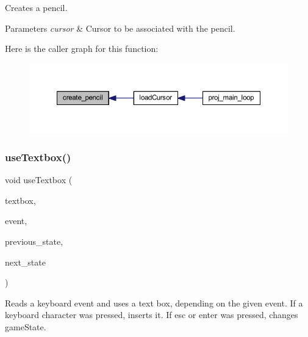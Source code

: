 Creates a pencil. 


\begin{DoxyParams}{Parameters}
{\em cursor} & Cursor to be associated with the pencil. \\
\hline
\end{DoxyParams}
Here is the caller graph for this function\+:\nopagebreak
\begin{figure}[H]
\begin{center}
\leavevmode
\includegraphics[width=350pt]{group__game__state_ga91d8df875d55d73e7d41279389adc390_icgraph}
\end{center}
\end{figure}
\mbox{\label{group__game__state_gab772180defa55e98f9b659c0c72e18d1}} 
\subsubsection{\texorpdfstring{use\+Textbox()}{useTextbox()}}
{\footnotesize\ttfamily void use\+Textbox (\begin{DoxyParamCaption}\item[{\mbox{\hyperlink{struct_text_box}{Text\+Box}} $\ast$}]{textbox,  }\item[{\mbox{\hyperlink{struct_event__t}{Event\+\_\+t}}}]{event,  }\item[{\mbox{\hyperlink{group__game__state_ga7899b65f1ea0f655e4bbf8d2a5714285}{Game\+State}}}]{previous\+\_\+state,  }\item[{\mbox{\hyperlink{group__game__state_ga7899b65f1ea0f655e4bbf8d2a5714285}{Game\+State}}}]{next\+\_\+state }\end{DoxyParamCaption})}



Reads a keyboard event and uses a text box, depending on the given event. If a keyboard character was pressed, inserts it. If esc or enter was pressed, changes game\+State. 


